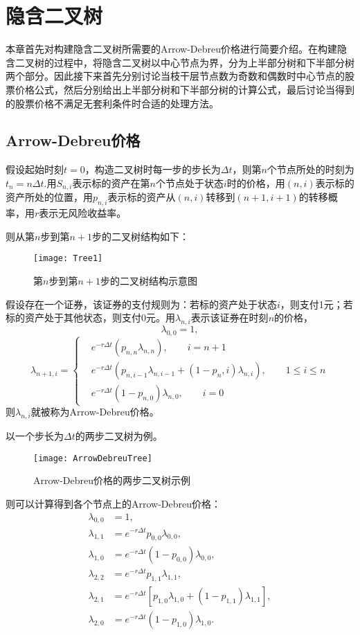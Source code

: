 \chapter{隐含二叉树}
本章首先对构建隐含二叉树所需要的Arrow-Debreu价格进行简要介绍。在构建隐含二叉树的过程中，将隐含二叉树以中心节点为界，分为上半部分树和下半部分树两个部分。因此接下来首先分别讨论当枝干层节点数为奇数和偶数时中心节点的股票价格公式，然后分别给出上半部分树和下半部分树的计算公式，最后讨论当得到的股票价格不满足无套利条件时合适的处理方法。

\section{Arrow-Debreu价格}
假设起始时刻$t = 0$，构造二叉树时每一步的步长为$\Delta t$，则第$n$个节点所处的时刻为$t_n = n\Delta t$.用$S_{n,i}$表示标的资产在第$n$个节点处于状态$i$时的价格，用$(n,i)$表示标的资产所处的位置，用$p_{n,i}$表示标的资产从$(n,i)$转移到$(n+1,i+1)$的转移概率，用$r$表示无风险收益率。

则从第$n$步到第$n+1$步的二叉树结构如下：
\begin{figure}[H]
	\centering
	\texttt{[image: Tree1]}
	\caption{第$n$步到第$n+1$步的二叉树结构示意图}
\end{figure}

假设存在一个证券，该证券的支付规则为：若标的资产处于状态$i$，则支付1元；若标的资产处于其他状态，则支付0元。用$\lambda_{n,i}$表示该证券在时刻$n$的价格，
$$	\lambda_{0,0} = 1,$$
\begin{equation*}
	\lambda_{n+1,i} = \left\{ 
	\begin{aligned}
		& e^{-r\Delta t} \left(p_{n,n}\lambda_{n,n}\right),  \qquad i = n+1\nonumber \\
		& e^{-r\Delta t}\left(p_{n,i-1}\lambda_{n,i-1}+\left(1-p_n,i\right)\lambda_{n,i}\right) ,\qquad 1\le  i\le  n \nonumber \\
		& e^{-r\Delta t} \left(1-p_{n,0}\right)\lambda_{n,0} ,\qquad i=0 \nonumber
	\end{aligned} \right.
\end{equation*}
则$\lambda_{n,i}$就被称为Arrow-Debreu价格。

以一个步长为$\Delta t$的两步二叉树为例。
\begin{figure}[H]
	\centering
	\texttt{[image: ArrowDebreuTree]}
	\caption{Arrow-Debreu价格的两步二叉树示例}
\end{figure}
则可以计算得到各个节点上的Arrow-Debreu价格：
\begin{align}
	\lambda_{0,0} & = 1, \nonumber\\
	\lambda_{1,1} & = e^{-r\Delta t} p_{0,0}\lambda_{0,0}, \nonumber\\
	\lambda_{1,0} & = e^{-r\Delta t} (1-p_{0,0})\lambda_{0,0} ,\nonumber \\
	\lambda_{2,2} & =  e^{-r\Delta t} p_{1,1}\lambda_{1,1},\nonumber\\
	\lambda_{2,1} & =  e^{-r\Delta t} \left[p_{1,0}\lambda_{1,0}+(1-p_{1,1})\lambda_{1,1}\right],\nonumber\\
	\lambda_{2,0}& = e^{-r\Delta t} (1-p_{1,0})\lambda_{1,0}. \nonumber
\end{align}

